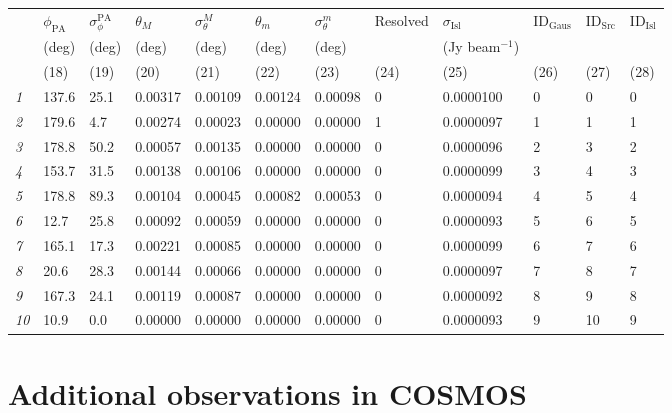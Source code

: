 \documentclass[usenatbib,usedcolumn]{mnras}
\begin{document}
\begin{table*}
\begin{minipage}{176mm}
\begin{tabular}{llllllllllll} \hline
 & $\phi_{\mathrm{PA}}$ & $\sigma_{\phi}^{\mathrm{PA}}$ & $\theta_{M}$ & $\sigma_{\theta}^{M}$ & $\theta_{m}$ & $\sigma_{\theta}^{m}$ & Resolved & $\sigma_{\mathrm{Isl}}$ & ID$_{\mathrm{Gaus}}$ & ID$_{\mathrm{Src}}$ & ID$_{\mathrm{Isl}}$ \\
 & (deg) & (deg) & (deg) & (deg) & (deg) & (deg) &  & (Jy beam$^{-1}$) & &  \\
 & (18) & (19) & (20) & (21) & (22) & (23) & (24) & (25) & (26) & (27) & (28) \\ \hline
\textcolor{mygray}{\emph{1}} & 137.6 & 25.1 & 0.00317 & 0.00109 & 0.00124 & 0.00098 & 0 & 0.0000100 & 0 & 0 & 0 \\
\textcolor{mygray}{\emph{2}} & 179.6 & 4.7 & 0.00274 & 0.00023 & 0.00000 & 0.00000 & 1 & 0.0000097 & 1 & 1 & 1 \\
\textcolor{mygray}{\emph{3}} & 178.8 & 50.2 & 0.00057 & 0.00135 & 0.00000 & 0.00000 & 0 & 0.0000096 & 2 & 3 & 2 \\
\textcolor{mygray}{\emph{4}} & 153.7 & 31.5 & 0.00138 & 0.00106 & 0.00000 & 0.00000 & 0 & 0.0000099 & 3 & 4 & 3 \\
\textcolor{mygray}{\emph{5}} & 178.8 & 89.3 & 0.00104 & 0.00045 & 0.00082 & 0.00053 & 0 & 0.0000094 & 4 & 5 & 4 \\
\textcolor{mygray}{\emph{6}} & 12.7 & 25.8 & 0.00092 & 0.00059 & 0.00000 & 0.00000 & 0 & 0.0000093 & 5 & 6 & 5 \\
\textcolor{mygray}{\emph{7}} & 165.1 & 17.3 & 0.00221 & 0.00085 & 0.00000 & 0.00000 & 0 & 0.0000099 & 6 & 7 & 6 \\
\textcolor{mygray}{\emph{8}} & 20.6 & 28.3 & 0.00144 & 0.00066 & 0.00000 & 0.00000 & 0 & 0.0000097 & 7 & 8 & 7 \\
\textcolor{mygray}{\emph{9}} & 167.3 & 24.1 & 0.00119 & 0.00087 & 0.00000 & 0.00000 & 0 & 0.0000092 & 8 & 9 & 8 \\
\textcolor{mygray}{\emph{10}} & 10.9 & 0.0 & 0.00000 & 0.00000 & 0.00000 & 0.00000 & 0 & 0.0000093 & 9 & 10 & 9 \\
\hline
\end{tabular}
\end{minipage}
\end{table*}


\section{Additional observations in COSMOS}
\label{sec:cosmosappendix}
\end{document}
